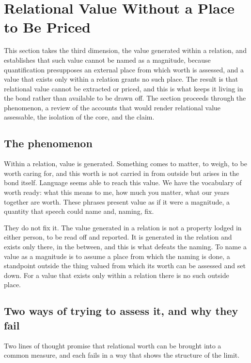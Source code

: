 \section{Relational Value Without a Place to Be Priced}
\label{p26:sec:value}

\noindent
This section takes the third dimension, the value generated within a relation, and establishes that such value cannot be named as a magnitude, because quantification presupposes an external place from which worth is assessed, and a value that exists only within a relation grants no such place. The result is that relational value cannot be extracted or priced, and this is what keeps it living in the bond rather than available to be drawn off. The section proceeds through the phenomenon, a review of the accounts that would render relational value assessable, the isolation of the core, and the claim.

\subsection*{The phenomenon}

Within a relation, value is generated. Something comes to matter, to weigh, to be worth caring for, and this worth is not carried in from outside but arises in the bond itself. Language seems able to reach this value. We have the vocabulary of worth ready: what this means to me, how much you matter, what our years together are worth. These phrases present value as if it were a magnitude, a quantity that speech could name and, naming, fix.

They do not fix it. The value generated in a relation is not a property lodged in either person, to be read off and reported. It is generated in the relation and exists only there, in the between, and this is what defeats the naming. To name a value as a magnitude is to assume a place from which the naming is done, a standpoint outside the thing valued from which its worth can be assessed and set down. For a value that exists only within a relation there is no such outside place.

\subsection*{Two ways of trying to assess it, and why they fail}

Two lines of thought promise that relational worth can be brought into a common measure, and each fails in a way that shows the structure of the limit.

